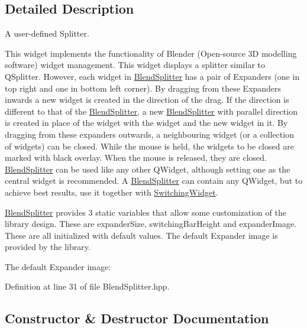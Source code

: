 \subsection{Detailed Description}
A user-\/defined Splitter. 

This widget implements the functionality of Blender (Open-\/source 3D modelling software) widget management. This widget displays a splitter similar to Q\+Splitter. However, each widget in \hyperlink{class_blend_splitter}{Blend\+Splitter} has a pair of Expanders (one in top right and one in bottom left corner). By dragging from these Expanders inwards a new widget is created in the direction of the drag. If the direction is different to that of the \hyperlink{class_blend_splitter}{Blend\+Splitter}, a new \hyperlink{class_blend_splitter}{Blend\+Splitter} with parallel direction is created in place of the widget with the widget and the new widget in it. By dragging from these expanders outwards, a neighbouring widget (or a collection of widgets) can be closed. While the mouse is held, the widgets to be closed are marked with black overlay. When the mouse is released, they are closed. \hyperlink{class_blend_splitter}{Blend\+Splitter} can be used like any other Q\+Widget, although setting one as the central widget is recommended. A \hyperlink{class_blend_splitter}{Blend\+Splitter} can contain any Q\+Widget, but to achieve best results, use it together with \hyperlink{class_switching_widget}{Switching\+Widget}.

\hyperlink{class_blend_splitter}{Blend\+Splitter} provides 3 static variables that allow some customization of the library design. These are expander\+Size, switching\+Bar\+Height and expander\+Image. These are all initialized with default values. The default Expander image is provided by the library.

The default Expander image\+:



Definition at line 31 of file Blend\+Splitter.\+hpp.



\subsection{Constructor \& Destructor Documentation}
\hypertarget{class_blend_splitter_a8a305d92da45200aa9cc3e7160124cc3}{}\label{class_blend_splitter_a8a305d92da45200aa9cc3e7160124cc3} 
